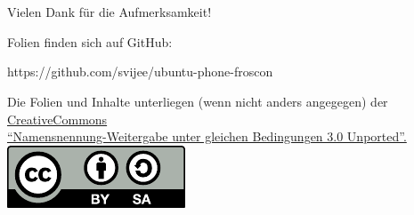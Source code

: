 \documentclass{beamer}
\begin{document}
\begin{frame}[c]
    \frametitle{~}

    \begin{center}
        Vielen Dank für die Aufmerksamkeit!
       
        Folien finden sich auf GitHub:

        https://github.com/svijee/ubuntu-phone-froscon\\[5em]

        \begin{scriptsize}
            Die Folien und Inhalte unterliegen (wenn nicht anders angegegen) der
            \href{http://creativecommons.org/licenses/by-sa/3.0/deed.de}{CreativeCommons \\
            "`Namensnennung-Weitergabe unter gleichen Bedingungen 3.0 Unported"'.\\[1em]
            \includegraphics[scale=0.5]{images/cc-by-sa-gross.pdf}}\\[2em]
        \end{scriptsize}
    \end{center}

\end{frame}
\end{document}
